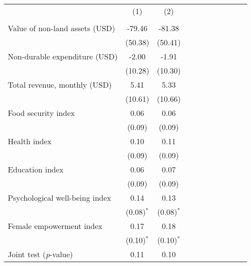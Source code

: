 {
\def\sym#1{\ifmmode^{#1}\else\(^{#1}\)\fi}
\begin{tabular}{l*{2}{SSSSS}}
\toprule
          &&\\
          &&\\
\midrule
Value of non-land assets (USD)&   -79.46&   -81.38\\
          &  (50.38)&  (50.41)\\
Non-durable expenditure (USD)&    -2.00&    -1.91\\
          &  (10.28)&  (10.30)\\
Total revenue, monthly (USD)&     5.41&     5.33\\
          &  (10.61)&  (10.66)\\
Food security index&     0.06&     0.06\\
          &   (0.09)&   (0.09)\\
Health index&     0.10&     0.11\\
          &   (0.09)&   (0.09)\\
Education index&     0.06&     0.07\\
          &   (0.09)&   (0.09)\\
Psychological well-being index&     0.14&     0.13\\
          &(0.08)$^{*}$&(0.08)$^{*}$\\
Female empowerment index&     0.17&     0.18\\
          &(0.10)$^{*}$&(0.10)$^{*}$\\
\midrule Joint test (\emph{p}-value)&     0.11&     0.10\\
\bottomrule
\end{tabular}
}
